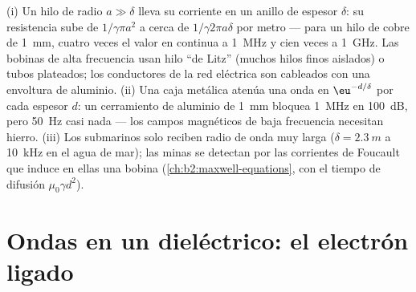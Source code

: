 \begin{example}\label{ex:b2:waves-in-media:skinuses}
(i) Un hilo de radio $a \gg \delta$ lleva su corriente en un anillo de
espesor $\delta$: su resistencia sube de $1/\gamma\pi a^2$ a cerca de $1/\gamma
2\pi a\delta$ por metro --- para un hilo de cobre de \qty{1}{mm}, cuatro veces el valor
en continua a \qty{1}{MHz} y cien veces a \qty{1}{GHz}. Las bobinas de alta
frecuencia usan hilo ``de Litz'' (muchos hilos finos aislados) o tubos
plateados; los conductores de la red eléctrica son cableados con una
envoltura de aluminio. (ii) Una caja metálica atenúa una onda en
$\eu^{-d/\delta}$ por cada espesor $d$: un cerramiento de aluminio de
\qty{1}{mm} bloquea \qty{1}{MHz} en \qty{100}{dB}, pero \qty{50}{Hz}
casi nada --- los campos magnéticos de baja frecuencia necesitan hierro. (iii)
Los submarinos solo reciben radio de onda muy larga ($\delta = \qty{2.3}{m}$ a
\qty{10}{kHz} en el agua de mar); las minas se detectan por las corrientes
de Foucault que induce en ellas una bobina (\cref{ch:b2:maxwell-equations},
con el tiempo de difusión $\mu_0\gamma d^2$).
\end{example}

\section{Ondas en un dieléctrico: el electrón ligado}

